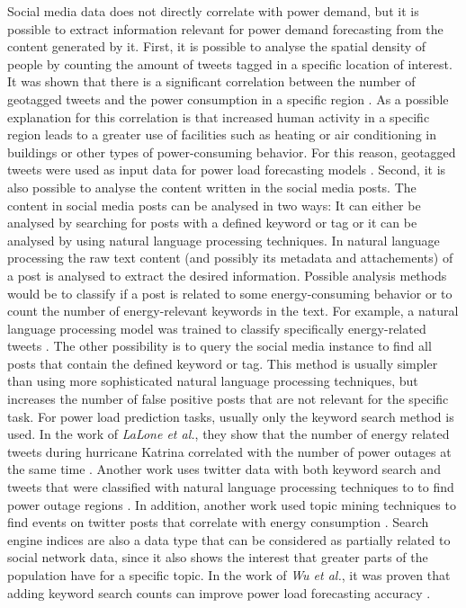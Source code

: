 Social media data does not directly correlate with power demand, but it is
possible to extract information relevant for power demand forecasting
from the content generated by it.
First, it is possible to analyse the spatial density of people by 
counting the amount of tweets tagged in a specific location of interest. 
It was shown that there is a significant
correlation between the number of geotagged tweets
and the power consumption in a specific region \cite{twittergeoloccorr}.
As a possible explanation for this correlation is that 
increased human activity in a specific region leads to a greater 
use of facilities such as heating or air conditioning in buildings or 
other types of power-consuming behavior.
For this reason, geotagged tweets were used as input data for 
power load forecasting models 
\cite{twittergeolocforecasting} \cite{twittergeolocforecasting2}.
Second, it is also possible to analyse the content written in the 
social media posts. The content in social media posts can be 
analysed in two ways: 
It can either be analysed by searching for posts with a defined keyword or tag
or it can be analysed by using natural language processing techniques. 
In natural language processing the raw text content 
(and possibly its metadata and attachements) of a post is analysed
to extract the desired information. Possible analysis
methods would be to classify if a post is related to some energy-consuming
behavior or to count the number of energy-relevant keywords in the text.
For example, a natural language processing model was trained to 
classify specifically energy-related tweets \cite{energybert}.
The other possibility is to query the social media instance 
to find all posts that contain the defined keyword or tag.
This method is usually simpler than using more sophisticated natural 
language processing techniques, but increases the number of false positive 
posts that are not relevant for the specific task.
For power load prediction tasks, usually only the keyword search method is used.
In the work of \textit{LaLone et al.}, they show that the number of energy
related tweets during hurricane Katrina correlated with the number of 
power outages at the same time \cite{poweroutagetwitter}.
Another work uses twitter data with both keyword search and 
tweets that were classified with natural language processing techniques to
to find power outage regions \cite{twitterpoweroutagelighttime}.
In addition, another work used topic mining techniques to find
events on twitter posts that correlate with energy consumption 
\cite{twittertopicevent}.
Search engine indices are also a data type that can be considered 
as partially related to social network data, since it also shows the 
interest that greater parts of the population have for a specific topic.
In the work of \textit{Wu et al.}, it was proven that adding 
keyword search counts can improve power load forecasting accuracy 
\cite{googlepowerforecast}.

